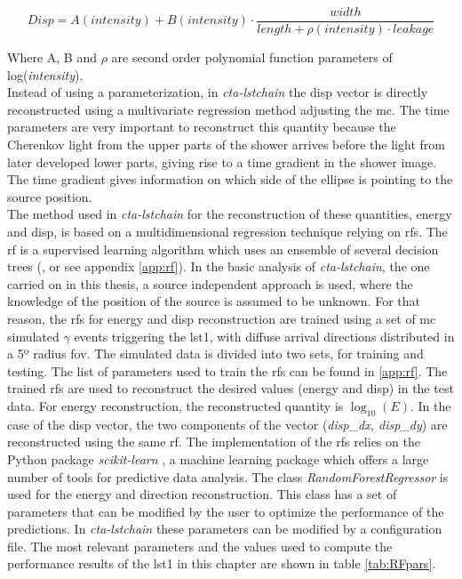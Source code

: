 \documentclass[main.tex]{subfiles}
\begin{document}
\begin{equation}
  Disp=A(intensity) + B(intensity) \cdot \frac{width}{length+\rho(intensity) \cdot leakage}
\end{equation}

Where A, B and $\rho$ are second order polynomial function parameters of log(\textit{intensity}).\\

Instead of using a parameterization, in \textit{cta-lstchain} the disp vector is directly reconstructed using a multivariate regression method adjusting the \gls{mc}. The time parameters are very important to reconstruct this quantity because the Cherenkov light from the upper parts of the shower arrives before the light from later developed lower parts, giving rise to a time gradient in the shower image. The time gradient gives information on which side of the ellipse is pointing to the source position.\\
The method used in \textit{cta-lstchain} for the reconstruction of these quantities, energy and disp, is based on a multidimensional regression technique relying on \glspl{rf}. The \gls{rf} is a supervised learning algorithm which uses an ensemble of several decision trees (\cite{breiman2001random}, or see appendix \ref{app:rf}).
In the basic analysis of \textit{cta-lstchain}, the one carried on in this thesis, a source independent approach is used, where the knowledge of the position of the source is assumed to be unknown. For that reason, the \glspl{rf} for energy and disp reconstruction are trained using a set of \gls{mc} simulated $\gamma$ events triggering the \gls{lst}1, with diffuse arrival directions distributed in a 5º radius \gls{fov}. The simulated data is divided into two sets, for training and testing. The list of parameters used to train the \glspl{rf} can be found in \ref{app:rf}.
The trained \glspl{rf} are used to reconstruct the desired values (energy and disp) in the test data. For energy reconstruction, the reconstructed quantity is $\log_{10}(E)$. In the case of the disp vector, the two components of the vector (\textit{disp\_dx, disp\_dy}) are reconstructed using the same \gls{rf}.
The implementation of the \glspl{rf} relies on the Python package \textit{scikit-learn} \cite{2011scikit-learn}, a machine learning package which offers a large number of tools for predictive data analysis. The class \textit{RandomForestRegressor} is used for the energy and direction reconstruction. This class has a set of parameters that can be modified by the user to optimize the performance of the predictions. In \textit{cta-lstchain} these parameters can be modified by a configuration file. The most relevant parameters and the values used to compute the performance results of the \gls{lst}1 in this chapter are shown in table \ref{tab:RFpars}.
\end{document}
